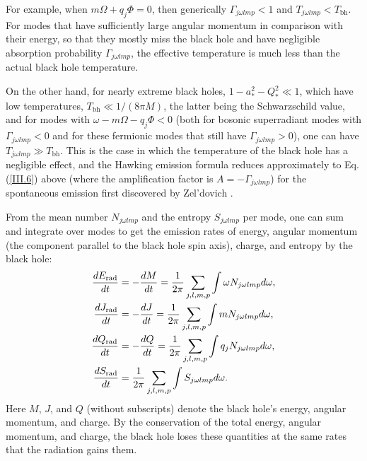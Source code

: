 \documentclass[12pt]{article} \usepackage{latexsym}
\begin{document}
For example, when $m\Omega+q_j\Phi = 0$, then generically
$\Gamma_{j\omega lmp} < 1$ and $T_{j\omega lmp} < T_{\mathrm{bh}}$.
For modes that have sufficiently large angular momentum in comparison
with their energy, so that they mostly miss the black hole and have
negligible absorption probability $\Gamma_{j\omega lmp}$, the
effective temperature is much less than the actual black hole
temperature.

On the other hand, for nearly extreme black holes, $1-a_*^2-Q_*^2 \ll
1$, which have low temperatures, $T_{\mathrm{bh}} \ll 1/(8\pi M)$, the
latter being the Schwarzschild value, and for modes with
$\omega-m\Omega-q_j\Phi < 0$ (both for bosonic superradiant modes with
$\Gamma_{j\omega lmp} < 0$ and for these fermionic modes that still
have $\Gamma_{j\omega lmp} > 0$), one can have $T_{j\omega lmp} \gg
T_{\mathrm{bh}}$.  This is the case in which the temperature of the
black hole has a negligible effect, and the Hawking emission formula
reduces approximately to Eq. (\ref{III.6}) above (where the
amplification factor is $A = - \Gamma_{j\omega lmp}$) for the
spontaneous emission first discovered by Zel'dovich \cite{Zel1,Zel2}.

From the mean number $N_{j\omega lmp}$ and the entropy $S_{j\omega
lmp}$ per mode, one can sum and integrate over modes to get the emission
rates of energy, angular momentum (the component parallel to the black
hole spin axis), charge, and entropy by the black hole:
 \begin{align}
 {dE_{\mathrm{rad}}\over dt} &= -{dM\over dt}
 = {1\over 2\pi}\sum_{j,l,m,p}\int \omega N_{j\omega lmp} d\omega,
 \label{eq:9}\\
 {dJ_{\mathrm{rad}}\over dt} &= -{dJ\over dt}
 = {1\over 2\pi}\sum_{j,l,m,p}\int m N_{j\omega lmp} d\omega,
 \label{eq:10}\\
 {dQ_{\mathrm{rad}}\over dt} &= -{dQ\over dt}
 = {1\over 2\pi}\sum_{j,l,m,p}\int q_j N_{j\omega lmp} d\omega,
 \label{eq:11}\\
 {dS_{\mathrm{rad}}\over dt}
 &= {1\over 2\pi}\sum_{j,l,m,p}\int S_{j\omega lmp} d\omega.
 \label{eq:12}
 \end{align}
Here $M$, $J$, and $Q$ (without subscripts) denote the black hole's
energy, angular momentum, and charge.  By the conservation of the
total energy, angular momentum, and charge, the black hole loses these
quantities at the same rates that the radiation gains them.
\end{document}

